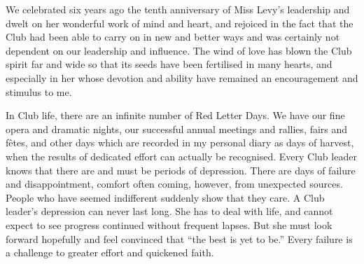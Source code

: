 We celebrated six years ago the tenth anniversary of
Miss Levy’s leadership and dwelt on her wonderful work
of mind and heart, and rejoiced in the fact that the Club
had been able to carry on in new and better ways and
was certainly not dependent on our leadership and influence.
The wind of love has blown the Club spirit
far and wide so that its seeds have been fertilised in many
hearts, and especially in her whose devotion and ability
have remained an encouragement and stimulus to me.

In Club life, there are an infinite number of Red Letter
Days. We have our fine opera and dramatic nights, our
successful annual meetings and rallies, fairs and fêtes,
and other days which are recorded in my personal diary
as days of harvest, when the results of dedicated effort
can actually be recognised. Every Club leader knows that
there are and must be periods of depression. There are
days of failure and disappointment, comfort often coming,
however, from unexpected sources. People who
have seemed indifferent suddenly show that they care. A
Club leader’s depression can never last long. She has to
deal with life, and cannot expect to see progress continued
without frequent lapses. But she must look forward hopefully
and feel convinced that “the best is yet to be.”
Every failure is a challenge to greater effort and
quickened faith.
